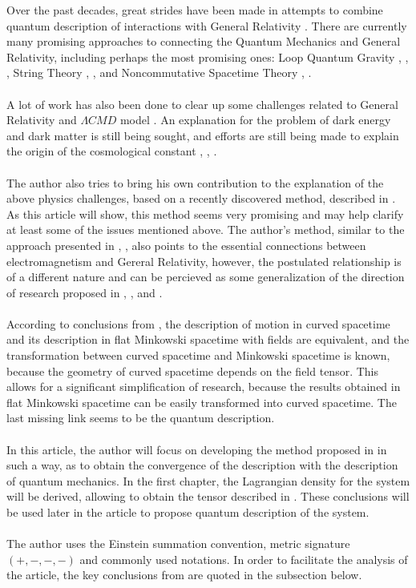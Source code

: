 \documentclass[aps,prx,preprint,groupedaddress,showkeys]{revtex4-2}
\begin{document}
Over the past decades, great strides have been made in attempts to combine quantum description of interactions with General Relativity \cite{INT1}. There are currently many promising approaches to connecting the Quantum Mechanics and General Relativity, including perhaps the most promising ones: Loop Quantum Gravity \cite{LQG1}, \cite{LQG2}, \cite{LQG3}, String Theory \cite{ST1}, \cite{ST2}, \cite{ST3} and Noncommutative Spacetime Theory \cite{NS1}, \cite{NS2}. \\
~\\
A lot of work has also been done to clear up some challenges related to General Relativity and $\Lambda CMD$ model \cite{LCMD}. An explanation for the problem of dark energy \cite{DE1} and dark matter \cite{DM1} is still being sought, and efforts are still being made to explain the origin of the cosmological constant  \cite{CC1}, \cite{CC2}, \cite{CC3}.\\
~\\
The author also tries to bring his own contribution to the explanation of the above physics challenges, based on a recently discovered method, described in \cite{PMofC}. As this article will show, this method seems very promising and may help clarify at least some of the issues mentioned above. The author's method, similar to the approach presented in \cite{DFF}, \cite{LLM}, \cite{GEM1} also points to the essential connections between electromagnetism and Gereral Relativity, however, the postulated relationship is of a different nature and can be percieved as some generalization of the direction of research proposed in \cite{BCIJ}, \cite{VGRA}, \cite{PGRA} and \cite{AGRA}.\\
~\\
According to conclusions from \cite{PMofC}, the description of motion in curved spacetime and its description in flat Minkowski spacetime with fields are equivalent, and the transformation between curved spacetime and Minkowski spacetime is known, because the geometry of curved spacetime depends on the field tensor. This allows for a significant simplification of research, because the results obtained in flat Minkowski spacetime can be easily transformed into curved spacetime. The last missing link seems to be the quantum description.\\
~\\
In this article, the author will focus on developing the method proposed in \cite{PMofC} in such a way, as to obtain the convergence of the description with the description of quantum mechanics. In the first chapter, the Lagrangian density for the system will be derived, allowing to obtain the tensor described in \cite{PMofC}. These conclusions will be used later in the article to propose quantum description of the system.\\
~\\ 
The author uses the Einstein summation convention, metric signature $(+,-,-,-)$ and commonly used notations. In order to facilitate the analysis of the article, the key conclusions from \cite{PMofC} are quoted in the subsection below. 
\end{document}
